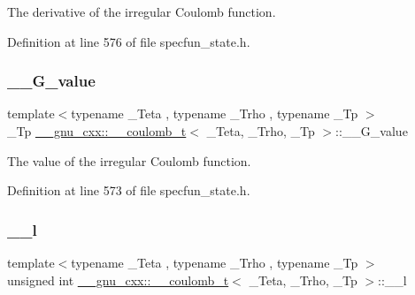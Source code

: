 The derivative of the irregular Coulomb function. 



Definition at line 576 of file specfun\+\_\+state.\+h.

\mbox{\label{struct____gnu__cxx_1_1____coulomb__t_a8449f7f993705fa16300ba3996d1ea28}} 
\subsubsection{\texorpdfstring{\+\_\+\+\_\+\+G\+\_\+value}{\_\_G\_value}}
{\footnotesize\ttfamily template$<$typename \+\_\+\+Teta , typename \+\_\+\+Trho , typename \+\_\+\+Tp $>$ \\
\+\_\+\+Tp \hyperlink{struct____gnu__cxx_1_1____coulomb__t}{\+\_\+\+\_\+gnu\+\_\+cxx\+::\+\_\+\+\_\+coulomb\+\_\+t}$<$ \+\_\+\+Teta, \+\_\+\+Trho, \+\_\+\+Tp $>$\+::\+\_\+\+\_\+\+G\+\_\+value}



The value of the irregular Coulomb function. 



Definition at line 573 of file specfun\+\_\+state.\+h.

\mbox{\label{struct____gnu__cxx_1_1____coulomb__t_a27fc4d32a00cb63b64e352a162c999d0}} 
\subsubsection{\texorpdfstring{\+\_\+\+\_\+l}{\_\_l}}
{\footnotesize\ttfamily template$<$typename \+\_\+\+Teta , typename \+\_\+\+Trho , typename \+\_\+\+Tp $>$ \\
unsigned int \hyperlink{struct____gnu__cxx_1_1____coulomb__t}{\+\_\+\+\_\+gnu\+\_\+cxx\+::\+\_\+\+\_\+coulomb\+\_\+t}$<$ \+\_\+\+Teta, \+\_\+\+Trho, \+\_\+\+Tp $>$\+::\+\_\+\+\_\+l}



